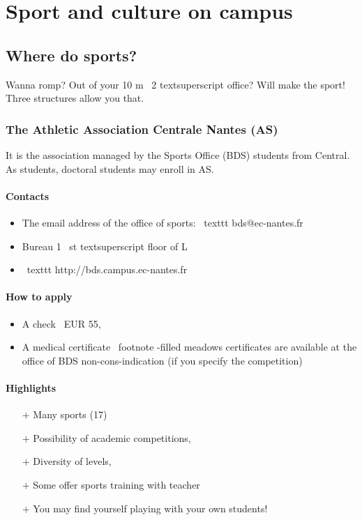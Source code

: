 \section{Sport and culture on campus}
\subsection {Where do sports?}
Wanna romp? Out of your 10 m \ {2} textsuperscript office?
Will make the sport! Three structures allow you that.

\subsubsection{The Athletic Association Centrale Nantes (AS)}
It is the association managed by the Sports Office (BDS) students from Central. As students, doctoral students may enroll in AS.
\paragraph{Contacts}
\begin{itemize}
  \item The email address of the office of sports: \ texttt {} bds@ec-nantes.fr
  \item Bureau 1 \ {st} textsuperscript floor of L
  \item \ texttt {} http://bds.campus.ec-nantes.fr
\end {itemize}
\paragraph{How to apply}
\begin{itemize}
  \item A check \ EUR {55},
  \item A medical certificate \ footnote {-filled meadows certificates are available at the office of BDS} non-cons-indication (if you specify the competition)
\end{itemize}

\paragraph{Highlights}
\begin{itemize}
  \item [$+$] Many sports (17)
  \item [$+$] Possibility of academic competitions,
  \item [$+$] Diversity of levels,
  \item [$+$] Some offer sports training with teacher
  \item [$+$] You may find yourself playing with your own students!
\end {itemize}
